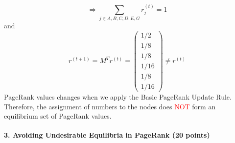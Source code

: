 \documentclass[11pt]{article} %
\begin{document}
\begin{itemize}
$$\Rightarrow \sum_{j \in {A,B,C,D,E,G}} r_j^{(t)}=1$$
and
$$r^{(t+1)}=M^T r^{(t)}= \left( \begin{array}{c}
1/2\\
1/8\\
1/8\\
1/16\\
1/8\\
1/16
\end{array}\right) \neq r^{(t)}$$
PageRank values changes when we apply the Basic PageRank Update Rule. Therefore, the assignment of numbers to the nodes does \textcolor{red}{NOT} form an equilibrium set of PageRank values.

\end{itemize}
 





















\paragraph{3. Avoiding Undesirable Equilibria in PageRank (20 points)}
 
\end{document}
